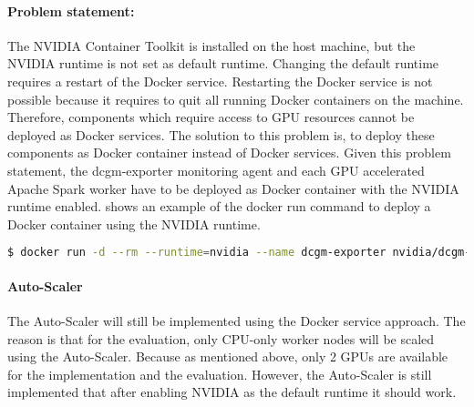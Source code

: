 \paragraph{Problem statement:}
The NVIDIA Container Toolkit is installed on the host machine, but the NVIDIA runtime is not set as default runtime.
Changing the default runtime requires a restart of the Docker service. Restarting the Docker service is not possible because it requires to quit all running Docker containers on the machine. Therefore, components which require access to GPU resources cannot be deployed as Docker services.
The solution to this problem is, to deploy these components as Docker container instead of Docker services.
Given this problem statement, the dcgm-exporter monitoring agent and each GPU accelerated Apache Spark worker have to be deployed as Docker container with the NVIDIA runtime enabled.
 shows an example of the docker run command to deploy a Docker container using the NVIDIA runtime.
\begin{lstlisting}[label=lst:06_env_prob_cmd, caption=Docker run command to deploy a container using the NVIDIA runtime, language=sh, numbers=none]
$ docker run -d --rm --runtime=nvidia --name dcgm-exporter nvidia/dcgm-exporter:latest
\end{lstlisting}

\paragraph{Auto-Scaler}
The Auto-Scaler will still be implemented using the Docker service approach. The reason is that for the evaluation, only CPU-only worker nodes will be scaled using the Auto-Scaler. Because as mentioned above, only 2 GPUs are available for the implementation and the evaluation.
However, the Auto-Scaler is still implemented that after enabling NVIDIA as the default runtime it should work.


